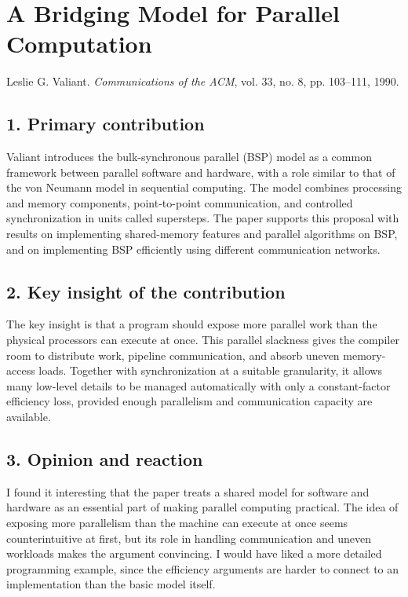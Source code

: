 \documentclass[11pt,a4paper]{article}
\begin{document}
\newpage
\section*{A Bridging Model for Parallel Computation}
{\small Leslie G. Valiant.
\emph{Communications of the ACM}, vol. 33, no. 8, pp. 103--111, 1990.}

\subsection*{1. Primary contribution}
Valiant introduces the bulk-synchronous parallel (BSP) model as a common
framework between parallel software and hardware, with a role similar to
that of the von Neumann model in sequential computing.
The model combines processing and memory components, point-to-point
communication, and controlled synchronization in units called supersteps.
The paper supports this proposal with results on implementing shared-memory
features and parallel algorithms on BSP, and on implementing BSP efficiently
using different communication networks.

\subsection*{2. Key insight of the contribution}
The key insight is that a program should expose more parallel work than
the physical processors can execute at once.
This parallel slackness gives the compiler room to distribute work,
pipeline communication, and absorb uneven memory-access loads.
Together with synchronization at a suitable granularity, it allows many
low-level details to be managed automatically with only a constant-factor
efficiency loss, provided enough parallelism and communication capacity
are available.

\subsection*{3. Opinion and reaction}
I found it interesting that the paper treats a shared model for software
and hardware as an essential part of making parallel computing practical.
The idea of exposing more parallelism than the machine can execute at once
seems counterintuitive at first, but its role in handling communication
and uneven workloads makes the argument convincing.
I would have liked a more detailed programming example, since the efficiency
arguments are harder to connect to an implementation than the basic model
itself.
\end{document}
